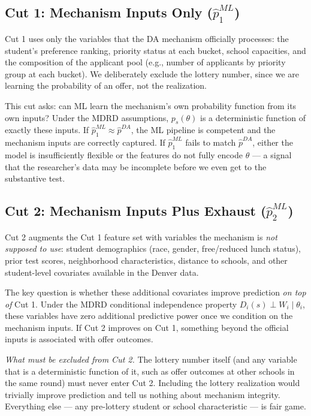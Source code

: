 \documentclass[12pt,a4paper,dvipsnames]{article}
\begin{document}
\subsection{Cut 1: Mechanism Inputs Only ($\hat{p}^{ML}_1$)}

Cut 1 uses only the variables that the DA mechanism officially processes: the student's preference ranking, priority status at each bucket, school capacities, and the composition of the applicant pool (e.g., number of applicants by priority group at each bucket). We deliberately exclude the lottery number, since we are learning the probability of an offer, not the realization.

This cut asks: can ML learn the mechanism's own probability function from its own inputs? Under the MDRD assumptions, $p_s(\theta)$ is a deterministic function of exactly these inputs. If $\hat{p}^{ML}_1 \approx \hat{p}^{DA}$, the ML pipeline is competent and the mechanism inputs are correctly captured. If $\hat{p}^{ML}_1$ fails to match $\hat{p}^{DA}$, either the model is insufficiently flexible or the features do not fully encode $\theta$ --- a signal that the researcher's data may be incomplete before we even get to the substantive test.

\subsection{Cut 2: Mechanism Inputs Plus Exhaust ($\hat{p}^{ML}_2$)}

Cut 2 augments the Cut 1 feature set with variables the mechanism is \textit{not supposed to use}: student demographics (race, gender, free/reduced lunch status), prior test scores, neighborhood characteristics, distance to schools, and other student-level covariates available in the Denver data.

The key question is whether these additional covariates improve prediction \textit{on top of} Cut 1. Under the MDRD conditional independence property $D_i(s) \perp W_i \mid \theta_i$, these variables have zero additional predictive power once we condition on the mechanism inputs. If Cut 2 improves on Cut 1, something beyond the official inputs is associated with offer outcomes.

\textit{What must be excluded from Cut 2.} The lottery number itself (and any variable that is a deterministic function of it, such as offer outcomes at other schools in the same round) must never enter Cut 2. Including the lottery realization would trivially improve prediction and tell us nothing about mechanism integrity. Everything else --- any pre-lottery student or school characteristic --- is fair game.
\end{document}
